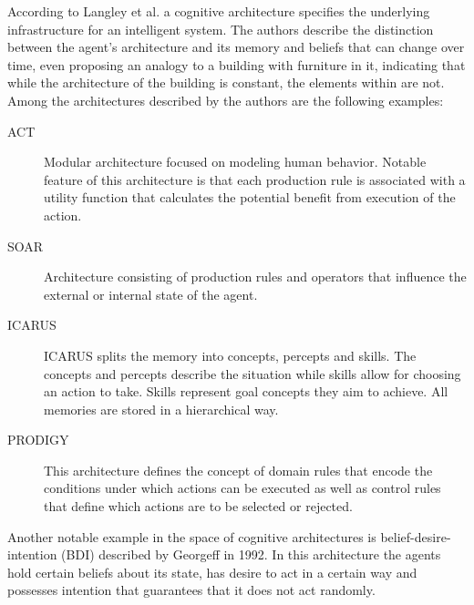 According to Langley et al.\cite{langley2009cognitive} a cognitive architecture specifies the underlying infrastructure for an intelligent system.
The authors describe the distinction between the agent's architecture and its memory and beliefs that can change over time, even proposing an analogy to a building with furniture in it, indicating that while the architecture of the building is constant, the elements within are not.
Among the architectures described by the authors are the following examples:

\begin{description}
    \item[ACT] Modular architecture focused on modeling human behavior. Notable feature of this architecture is that each production rule is associated with a utility function that calculates the potential benefit from execution of the action.
    \item[SOAR] Architecture consisting of production rules and operators that influence the external or internal state of the agent.
    \item[ICARUS] ICARUS splits the memory into concepts, percepts and skills. The concepts and percepts describe the situation while skills allow for choosing an action to take. Skills represent goal concepts they aim to achieve. All memories are stored in a hierarchical way.
    \item[PRODIGY] This architecture defines the concept of domain rules that encode the conditions under which actions can be executed as well as control rules that define which actions are to be selected or rejected.
\end{description}

Another notable example in the space of cognitive architectures is belief-desire-intention (BDI) described by Georgeff in 1992\cite{georgeff1992abstract}.
In this architecture the agents hold certain beliefs about its state, has desire to act in a certain way and possesses intention that guarantees that it does not act randomly.

